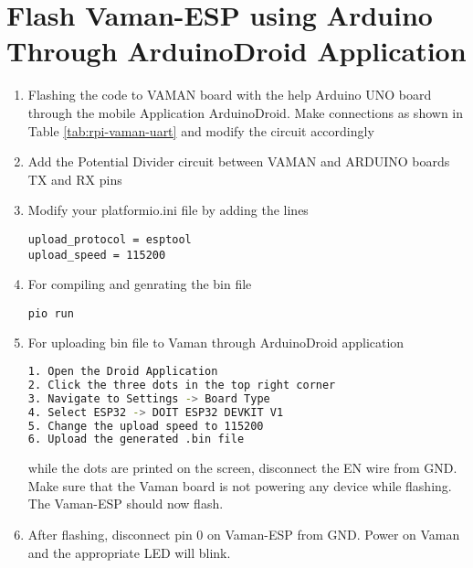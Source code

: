 \documentclass[12pt]{article}
\begin{document}
\section{Flash Vaman-ESP using Arduino Through ArduinoDroid Application}

\renewcommand{\theequation}{\theenumi}
\renewcommand{\thefigure}{\theenumi}
\begin{enumerate}[label=\thesubsection.\arabic*.,ref=\thesubsection.\theenumi]
\item Flashing the code to VAMAN board with the help Arduino UNO board through the mobile Application ArduinoDroid. Make connections as shown in Table \ref{tab:rpi-vaman-uart} and modify the circuit accordingly
			\begin{table}[!h]
		
		\caption{}
		\label{tab:rpi-vaman-uart}
	\end{table}
\item Add the Potential Divider circuit between VAMAN and ARDUINO boards TX and RX pins
\item Modify your platformio.ini file by adding the lines
\begin{lstlisting}
upload_protocol = esptool
upload_speed = 115200
\end{lstlisting}

\item For compiling and genrating the bin file 
\begin{lstlisting}
pio run
\end{lstlisting}
\item For uploading bin file to Vaman through ArduinoDroid application 
\begin{lstlisting}[language=bash]
1. Open the Droid Application
2. Click the three dots in the top right corner
3. Navigate to Settings -> Board Type
4. Select ESP32 -> DOIT ESP32 DEVKIT V1
5. Change the upload speed to 115200
6. Upload the generated .bin file
\end{lstlisting}



while the dots are printed on the screen, disconnect the EN wire from GND.   Make sure that the Vaman board is not powering any device while flashing.  The Vaman-ESP should now flash.
\item After flashing, disconnect pin 0 on Vaman-ESP from GND. Power on Vaman and the appropriate LED will blink.
\end{enumerate}
\end{document}
